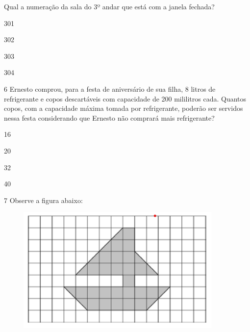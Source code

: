 \pagebreak
Qual a numeração da sala do 3º andar que está com a janela fechada?

\begin{minipage}{.5\textwidth}
\begin{escolha}
\item
  301
\item
  302
\item
  303
\item
  304
\end{escolha}
\end{minipage}

\num{6} Ernesto comprou, para a festa de aniversário de sua filha, 
8 litros de refrigerante e copos descartáveis com capacidade de 200
mililitros cada. Quantos copos, com a capacidade máxima tomada por
refrigerante, poderão ser servidos nessa festa considerando que Ernesto 
não comprará mais refrigerante?

\begin{minipage}{.5\textwidth}
\begin{escolha}
\item
  16
\item
  20
\item
  32
\item
  40
\end{escolha}
\end{minipage}

\num{7} Observe a figura abaixo:

\begin{figure}[htpb!]
\includegraphics[width=.8\textwidth]{./imgs/mat19.png}
\end{figure}

